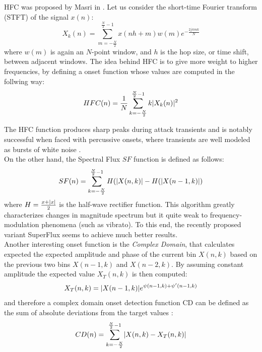 HFC was proposed by Masri in \cite{masri96}. Let us consider the short-time Fourier transform (STFT) of the signal $x(n)$:\\
\begin{equation}
X_k(n) = \sum\limits_{m=-\frac{N}{2}}^{\frac{N}{2}-1} x(nh + m)w(m)e^{-\frac{2j\pi mk}{N}}
\end{equation}
where $w(m)$ is again an $N$-point window, and $h$ is the hop size, or time shift, between adjacent windows. The idea behind HFC is to give more weight to higher frequencies, by defining a onset function whose values are computed in the follwing way:
\begin{equation}
HFC(n) = \frac{1}{N}\sum\limits_{k=-\frac{N}{2}}^{\frac{N}{2}-1} k\lvert X_k(n)\rvert^{2}
\end{equation}

The HFC function produces sharp peaks during attack transients and is notably successful when faced with percussive onsets, where transients are well modeled as bursts of white noise \cite{bello05}.\\
On the other hand, the Spectral Flux $SF$ function is defined as follows:
\begin{equation}
SF(n) = \sum\limits_{k=-\frac{N}{2}}^{\frac{N}{2}-1} H(\lvert X(n, k)\rvert - H(\lvert X(n - 1, k)\rvert)
\end{equation}
where $H = \frac{x + \lvert x\rvert}{2}$ is the half-wave rectifier function. This algorithm greatly characterizes changes in magnitude spectrum but it quite weak to frequency-modulation phenomena (such as vibrato). To this end, the recently proposed variant SuperFlux \cite{bock13} seems to achieve much better results. \\
Another interesting onset function is the \textit{Complex Domain}, that calculates expected the expected amplitude and phase of the current bin $X(n, k)$ based on the previous two bins $X(n - 1, k)$ and $X(n -2, k)$. By assuming constant amplitude the expected value $X_T(n, k)$ is then computed:
\begin{equation}
X_T(n, k) = \lvert X(n - 1, k)\rvert e^{\psi (n - 1, k) + \psi ' (n - 1, k)} 
\end{equation}
and therefore a complex domain onset detection function CD can be defined as the sum of absolute deviations from the target values \cite{dixon06}:
\begin{equation}
CD(n) = \sum\limits_{k=-\frac{N}{2}}^{\frac{N}{2}-1} \lvert X(n, k)-X_T(n,k)\rvert
\end{equation}

